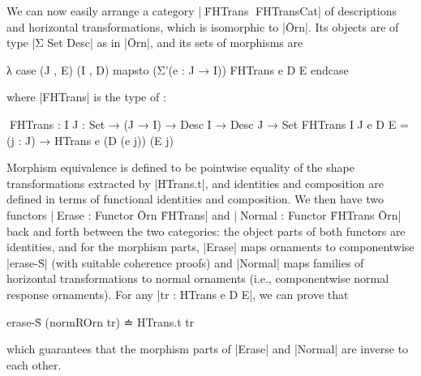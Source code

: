 We can now easily arrange a category |^^^ḞHTrans ^^^FHTransCat| of descriptions and horizontal transformations, which is isomorphic to |Ōrn|.
Its objects are of type |Σ Set Desc| as in |Ōrn|, and its sets of morphisms are
\begin{code}
λ case (J , E) (I , D) mapsto (Σ'(e : J → I)) FHTrans e D E endcase
\end{code}
where |FHTrans| is the type of :
\begin{code}
^^^FHTrans : {I J : Set} → (J → I) → Desc I → Desc J → Set
FHTrans {I} {J} e D E = (j : J) → HTrans e (D (e j)) (E j)
\end{code}
Morphism equivalence is defined to be pointwise equality of the shape transformations extracted by |HTrans.t|, and identities and composition are defined in terms of functional identities and composition.
We then have two functors |^^^Erase : Functor Ōrn ḞHTrans| and |^^^Normal : Functor ḞHTrans Ōrn| back and forth between the two categories: the object parts of both functors are identities, and for the morphism parts, |Erase| maps ornaments to componentwise |erase-Ṡ| (with suitable coherence proofs) and |Normal| maps families of horizontal transformations to normal ornaments (i.e., componentwise normal response ornaments).
For any |tr : HTrans e D E|, we can prove that
\begin{code}
erase-Ṡ (normROrn tr) ≐ HTrans.t tr
\end{code}
which guarantees that the morphism parts of |Erase| and |Normal| are inverse to each other.

